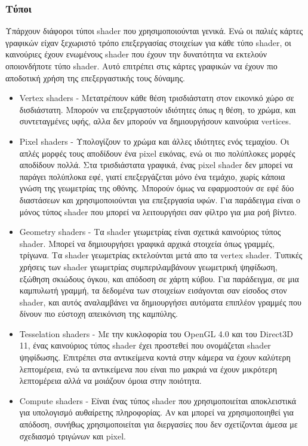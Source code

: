 \subsubsection{Τύποι}
Υπάρχουν διάφοροι τύποι shader που χρησιμοποιούνται γενικά. Ενώ οι παλιές κάρτες γραφικών είχαν ξεχωριστό τρόπο επεξεργασίας στοιχείων για κάθε τύπο shader, οι καινούριες έχουν ενωμένους shader που έχουν την δυνατότητα να εκτελούν οποιονδήποτε τύπο shader. Αυτό επιτρέπει στις κάρτες γραφικών να έχουν πιο αποδοτική χρήση της επεξεργαστικής τους δύναμης.
\begin{itemize}
\item Vertex shaders - Μετατρέπουν κάθε θέση τρισδιάστατη στον εικονικό χώρο σε δισδιάστατη. Μπορούν να επεξεργαστούν ιδιότητες όπως η θέση, το χρώμα, και συντεταγμένες υφής, αλλα δεν μπορούν να δημιουργήσουν καινούρια vertices.
\item Pixel shaders - Υπολογίζουν το χρώμα και άλλες ιδιότητες ενός τεμαχίου. Οι απλές μορφές τους αποδίδουν ένα pixel εικόνας, ενώ οι πιο πολύπλοκες μορφές αποδίδουν πολλά. Στα τρισδιάστατα γραφικά, ένας pixel shader δεν μπορεί να παράγει πολύπλοκα εφέ, γιατί επεξεργάζεται μόνο ένα τεμάχιο, χωρίς κάποια γνώση της γεωμετρίας της οθόνης. Μπορούν όμως να εφαρμοστούν σε εφέ δύο διαστάσεων και χρησιμοποιούνται για επεξεργασία υφών. Για παράδειγμα είναι ο μόνος τύπος shader που μπορεί να λειτουργήσει σαν φίλτρο για μια ροή βίντεο.
\item Geometry shaders - Τα shader γεωμετρίας είναι σχετικά καινούριος τύπος shader. Μπορεί να δημιουργήσει γραφικά αρχικά στοιχεία όπως γραμμές, τρίγωνα. Τα shader γεωμετρίας εκτελούνται μετά απο τα vertex shader. Τυπικές χρήσεις των shader γεωμετρίας συμπεριλαμβάνουν γεωμετρική ψηφίδωση, εξώθηση σκιώδους όγκου, και απόδοση σε χάρτη κύβου. Για παράδειγμα, σε μια καμπυλωτή γραμμή, τα δεδομένα των στοιχείων εισάγονται σαν είσοδος στον shader, και αυτός αναλαμβάνει να δημιουργήσει αυτόματα επιπλέον γραμμές που δίνουν πιο εύστοχη απεικόνιση της καμπύλης.
\item Tesselation shaders - Με την κυκλοφορία του OpenGL 4.0 και του Direct3D 11, ένας καινούριος τύπος shader έχει προστεθεί που ονομάζεται shader ψηφίδωσης. Επιτρέπει στα αντικείμενα κοντά στην κάμερα να έχουν καλύτερη λεπτομέρεια, ενώ τα αντικείμενα που είναι πιο μακριά να έχουν μικρότερη λεπτομέρεια αλλά να μοιάζουν όμοια στην ποιότητα.
\item Compute shaders - Είναι ένας τύπος shader που χρησιμοποιείται αποκλειστικά για υπολογισμό αυθαίρετης πληροφορίας. Αν και μπορεί να χρησιμοποιηθεί για απόδοση, συνήθως χρησιμοποιείται για διεργασίες που δεν σχετίζονται άμεσα με σχεδιασμό τριγώνων και pixel.
\end{itemize}
